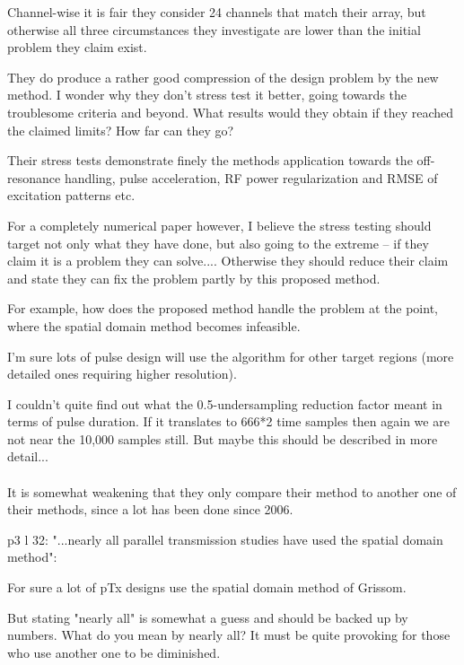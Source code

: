 \documentclass[11pt]{article}
\begin{document}
Channel-wise it is fair they consider 24 channels that match their array, but otherwise all three circumstances they investigate are lower than the initial problem they claim exist.

They do produce a rather good compression of the design problem by the new method. I wonder why they don't stress test it better, going towards the troublesome criteria and beyond. What results would they obtain if they reached the claimed limits? How far can they go?

Their stress tests demonstrate finely the methods application towards the off-resonance handling, pulse acceleration, RF power regularization and RMSE of excitation patterns etc.

For a completely numerical paper however, I believe the stress testing should target not only what they have done, but also going to the extreme -- if they claim it is a problem they can solve.... Otherwise they should reduce their claim and state they can fix the problem partly by this proposed method.

For example, how does the proposed method handle the problem at the point, where the spatial domain method becomes infeasible.

I'm sure lots of pulse design will use the algorithm for other target regions (more detailed ones requiring higher resolution).

I couldn't quite find out what the 0.5-undersampling reduction factor meant in terms of pulse duration. If it translates to 666*2 time samples then again we are not near the 10,000 samples still. But maybe this should be described in more detail...
\\[0.2em]
\indent{\it \textcolor{red}{TODO: Clarify how the trajectory changed between the different $R$ factors. 
We have updated the numbers in the Introduction to slightly more realistic values. 
We will report the design times across $R$ factors.}}
\\[1.2em]

 It is somewhat weakening that they only compare their method to another one of their methods, since a lot has been done since 2006.

p3 l 32: "...nearly all parallel transmission studies have used the spatial domain method":

For sure a lot of pTx designs use the spatial domain method of Grissom.

But stating "nearly all" is somewhat a guess and should be backed up by numbers. What do you mean by nearly all? It must be quite provoking for those who use another one to be diminished.
\end{document}
